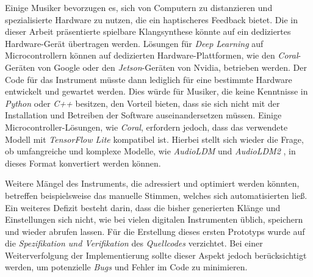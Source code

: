 \documentclass[
  a4paper,  %
  twoside,  %
  bibliography=totoc,
  headsepline,
  cleardoublepage=empty,
  parskip=half,
  draft=false
]{scrbook}
\begin{document}
{Einige Musiker bevorzugen es, sich von Computern zu distanzieren und spezialisierte Hardware zu nutzen, die ein haptischeres Feedback bietet. Die in dieser Arbeit präsentierte spielbare Klangsynthese könnte auf ein dediziertes Hardware-Gerät übertragen werden. Lösungen für \emph{Deep Learning} auf Microcontrollern \cite{saha_machine_2022} können auf dedizierten Hardware-Plattformen, wie den \emph{Coral}-Geräten \cite{noauthor_coral_nodate} von Google oder den \emph{Jetson}-Geräten \cite{noauthor_jetson_nodate} von Nvidia, betrieben werden. Der Code für das Instrument müsste dann lediglich für eine bestimmte Hardware entwickelt und gewartet werden. Dies würde für Musiker, die keine Kenntnisse in \emph{Python} oder \emph{C++} besitzen, den Vorteil bieten, dass sie sich nicht mit der Installation und Betreiben der Software auseinandersetzen müssen. Einige Microcontroller-Lösungen, wie \emph{Coral}, erfordern jedoch, dass das verwendete Modell mit \emph{TensorFlow Lite} \cite{noauthor_tensorflow_nodate} kompatibel ist. Hierbei stellt sich wieder die Frage, ob umfangreiche und komplexe Modelle, wie \emph{AudioLDM} \cite{liu_audioldm_2023} und \emph{AudioLDM2} \cite{liu_audioldm2_2023}, in dieses Format konvertiert werden können.

Weitere Mängel des Instruments, die adressiert und optimiert werden könnten, betreffen beispielsweise das manuelle Stimmen, welches sich automatisierten ließ. Ein weiteres Defizit besteht darin, dass die bisher generierten Klänge und Einstellungen sich nicht, wie bei vielen digitalen Instrumenten üblich, speichern und wieder abrufen lassen. Für die Erstellung dieses ersten Prototyps wurde auf die \emph{Spezifikation und Verifikation} des \emph{Quellcodes} verzichtet. Bei einer Weiterverfolgung der Implementierung sollte dieser Aspekt jedoch berücksichtigt werden, um potenzielle \emph{Bugs} und Fehler im Code zu minimieren.

}
\end{document}

